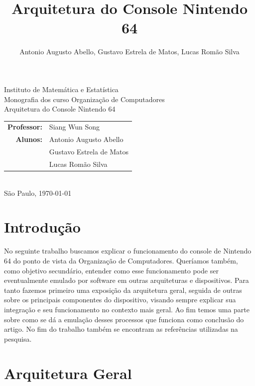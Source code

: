 \documentclass[12pt]{article}
\title{Arquitetura do Console Nintendo 64}
\author{Antonio Augusto Abello, Gustavo Estrela de Matos, Lucas Romão
Silva}
\begin{document}
\doublespacing
\begin{titlepage}
    \vfill
    \begin{center}
        \vspace{0.5\textheight}
        \noindent
        Instituto de Matemática e Estatística \\
        Monografia dos curso Organização de Computadores \\
        \vfill
        \noindent
        {\Large Arquitetura do Console Nintendo 64} \\
        \begin{tabular}{rl}
            {\bf Professor:} & {Siang Wun Song} \\
            {\bf Alunos:}    & {Antonio Augusto Abello} \\
                             & {Gustavo Estrela de Matos} \\
                             & {Lucas Romão Silva} \\
        \end{tabular} \\
        \vspace{\fill}
       \bigskip
        São Paulo, \today \\
       \bigskip
    \end{center}
\end{titlepage}

\pagebreak
\tableofcontents
\pagebreak

\section{Introdução}
No seguinte trabalho buscamos explicar o funcionamento do console de Nintendo 64 do ponto de vista da Organização de Computadores. Queríamos também, como objetivo secundário, entender como esse funcionamento pode ser eventualmente emulado por software em outras arquiteturas e dispositivos.
Para tanto fazemos primeiro uma exposição da arquitetura geral, seguida de outras sobre os principais componentes do dispositivo, visando sempre explicar sua integração e seu funcionamento no contexto mais geral. Ao fim temos uma parte sobre como se dá a emulação desses processos que funciona como conclusão do artigo. No fim do trabalho também se encontram as referências utilizadas na pesquisa.
\section{Arquitetura Geral}
\end{document}
